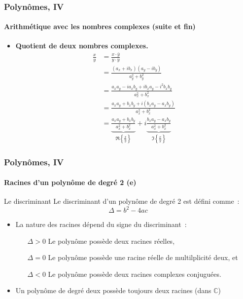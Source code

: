\documentclass[10pt,notheorems]{beamer}
\theoremstyle{plain}
\theoremstyle{definition} %
\begin{document}
\begin{frame}
  \frametitle{Polynômes, IV}
  \framesubtitle{Arithmétique avec les nombres complexes (suite et fin)}
  \hypertarget{slide_polynome_2_imaginaire_4}{}

  \bigskip

  \begin{itemize}

  \item \textbf{Quotient de deux nombres complexes.}
    \[
      \begin{split}
        \frac{x}{y} &= \frac{x \cdot \bar y}{y \cdot \bar y}\\
        &= \frac{(a_x+ib_x)(a_y-ib_y)}{a_y^2 + b_y^2}\\
        &= \frac{a_xa_y-ia_xb_y+ib_xa_y-i^2b_xb_y}{a_x^2 + b_x^2}\\
        &= \frac{a_xa_y+b_xb_y+i(b_xa_y-a_xb_y)}{a_x^2 + b_x^2}\\
        &= \underbrace{\frac{a_xa_y+b_xb_y}{a_x^2 + b_x^2}}_{\Re\left\{\frac{x}{y}\right\}} + i \underbrace{\frac{b_xa_y-a_xb_y}{a_x^2 + b_x^2}}_{\Im\left\{\frac{x}{y}\right\}}
      \end{split}
    \]

  \end{itemize}

\end{frame}


\begin{frame}
  \frametitle{Polynômes, IV}
  \framesubtitle{Racines d'un polynôme de degré 2 (e)}
  \hypertarget{slide_polynome_2_racines_5}{}

  \bigskip

  \begin{block}{Le discriminant}
    Le discriminant d'un polynôme de degré 2 est défini comme~:
    \[
      \Delta = b^2-4ac
    \]
  \end{block}

  \bigskip

  \begin{itemize}

  \item La nature des racines dépend du signe du discriminant~:\newline

    \begin{itemize}
    \item[$\Delta>0$] Le polynôme possède deux racines réelles,\newline
    \item[$\Delta=0$] Le polynôme possède une racine réelle de multilplicité deux, et\newline
    \item[$\Delta<0$] Le polynôme possède deux racines complexes conjuguées.\newline
    \end{itemize}

  \item Un polynôme de degré deux possède toujours deux racines (dans $\mathbb C$)

  \end{itemize}

\end{frame}
\end{document}

